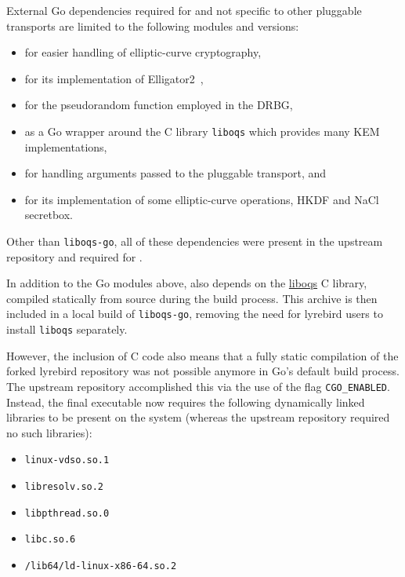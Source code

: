 External Go dependencies required for \drivel{} and not specific to other pluggable transports are limited to the following modules and versions:
\begin{itemize}
    \item {} for easier handling of elliptic-curve cryptography,
    
    \item {} for its implementation of \textsf{Elligator2}~\cite{CCS:BHKL13},
    
    \item {} for the pseudorandom function employed in the DRBG,
    
    \item {} as a Go wrapper around the C library \texttt{liboqs} which provides many KEM implementations,
    
    \item {} for handling arguments passed to the pluggable transport, and
    
    \item {} for its implementation of some elliptic-curve operations, HKDF and NaCl secretbox.
\end{itemize}

Other than \texttt{liboqs-go}, all of these dependencies were present in the upstream repository and required for \obfsfour{}.

In addition to the Go modules above, \drivel{} also depends on the \href{https://github.com/open-quantum-safe/liboqs}{liboqs} C library, compiled statically from source during the build process. This archive is then included in a local build of \texttt{liboqs-go}, removing the need for lyrebird users to install \texttt{liboqs} separately.

However, the inclusion of C code also means that a fully static compilation of the forked lyrebird repository was not possible anymore in Go's default build process. The upstream repository accomplished this via the use of the flag \texttt{CGO\_ENABLED}. Instead, the final executable now requires the following dynamically linked libraries to be present on the system (whereas the upstream repository required no such libraries):
\begin{itemize}
    \item \texttt{linux-vdso.so.1}
    \item \texttt{libresolv.so.2}
    \item \texttt{libpthread.so.0}
    \item \texttt{libc.so.6}
    \item \texttt{/lib64/ld-linux-x86-64.so.2}
\end{itemize}


